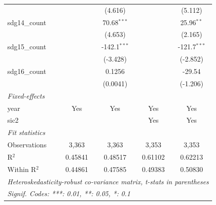 \begin{tabular}{lcccc}
                     &                   & (4.616)           &                   & (5.112)\\   
   sdg14\_count      &                   & 70.68$^{***}$     &                   & 25.96$^{**}$\\   
                     &                   & (4.653)           &                   & (2.165)\\   
   sdg15\_count      &                   & -142.1$^{***}$    &                   & -121.7$^{***}$\\   
                     &                   & (-3.428)          &                   & (-2.852)\\   
   sdg16\_count      &                   & 0.1256            &                   & -29.54\\   
                     &                   & (0.0041)          &                   & (-1.206)\\   
   \midrule
   \emph{Fixed-effects}\\
   year              & Yes               & Yes               & Yes               & Yes\\  
   sic2              &                   &                   & Yes               & Yes\\  
   \midrule
   \emph{Fit statistics}\\
   Observations      & 3,363             & 3,363             & 3,353             & 3,353\\  
   R$^2$             & 0.45841           & 0.48517           & 0.61102           & 0.62213\\  
   Within R$^2$      & 0.44861           & 0.47585           & 0.49383           & 0.50830\\  
   \midrule \midrule
   \multicolumn{5}{l}{\emph{Heteroskedasticity-robust co-variance matrix, t-stats in parentheses}}\\
   \multicolumn{5}{l}{\emph{Signif. Codes: ***: 0.01, **: 0.05, *: 0.1}}\\
\end{tabular}
\par\endgroup


